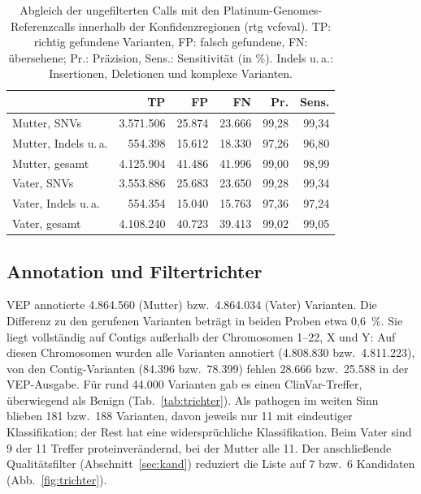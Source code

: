 \documentclass[10pt,a4paper,twocolumn]{article}
\begin{document}
\begin{table}[t]
\centering
\scriptsize
\setlength{\tabcolsep}{3pt}
\caption{Abgleich der ungefilterten Calls mit den Platinum-Genomes-Referenzcalls innerhalb der Konfidenzregionen (rtg vcfeval). TP: richtig gefundene Varianten, FP: falsch gefundene, FN: \"ubersehene; Pr.: Pr\"azision, Sens.: Sensitivit\"at (in \%). Indels u.\,a.: Insertionen, Deletionen und komplexe Varianten.}
\label{tab:val}
\begin{tabular}{lrrrrr}
\toprule
 & TP & FP & FN & Pr. & Sens. \\
\midrule
Mutter, SNVs & 3.571.506 & 25.874 & 23.666 & 99,28 & 99,34 \\
Mutter, Indels u.\,a. & 554.398 & 15.612 & 18.330 & 97,26 & 96,80 \\
Mutter, gesamt & 4.125.904 & 41.486 & 41.996 & 99,00 & 98,99 \\
\midrule
Vater, SNVs & 3.553.886 & 25.683 & 23.650 & 99,28 & 99,34 \\
Vater, Indels u.\,a. & 554.354 & 15.040 & 15.763 & 97,36 & 97,24 \\
Vater, gesamt & 4.108.240 & 40.723 & 39.413 & 99,02 & 99,05 \\
\bottomrule
\end{tabular}
\end{table}

\subsection{Annotation und Filtertrichter}
VEP annotierte 4.864.560 (Mutter) bzw.\ 4.864.034 (Vater) Varianten. Die Differenz zu den gerufenen Varianten betr\"agt in beiden Proben etwa 0,6~\%. Sie liegt vollst\"andig auf Contigs au\ss erhalb der Chromosomen 1--22, X und Y: Auf diesen Chromosomen wurden alle Varianten annotiert (4.808.830 bzw.\ 4.811.223), von den Contig-Varianten (84.396 bzw.\ 78.399) fehlen 28.666 bzw.\ 25.588 in der VEP-Ausgabe. F\"ur rund 44.000 Varianten gab es einen ClinVar-Treffer, \"uberwiegend als \glqq Benign\grqq{} (Tab.~\ref{tab:trichter}). Als pathogen im weiten Sinn blieben 181 bzw.\ 188 Varianten, davon jeweils nur 11 mit eindeutiger Klassifikation; der Rest hat eine widerspr\"uchliche Klassifikation. Beim Vater sind 9 der 11 Treffer proteinver\"andernd, bei der Mutter alle 11. Der anschlie\ss ende Qualit\"atsfilter (Abschnitt~\ref{sec:kand}) reduziert die Liste auf 7 bzw.\ 6 Kandidaten (Abb.~\ref{fig:trichter}).
\end{document}
